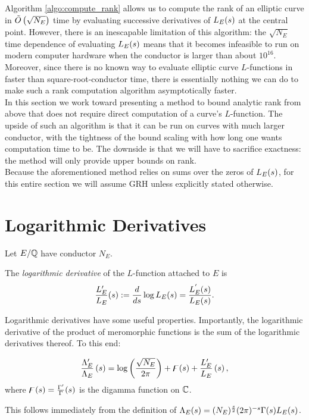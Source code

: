 
Algorithm \ref{algo:compute_rank} allows us to compute the rank of an elliptic curve in $\tilde{O}\left(\sqrt{N_E}\right)$ time by evaluating successive derivatives of $L_E(s)$ at the central point. However, there is an inescapable limitation of this algorithm: the $\sqrt{N_E}$ time dependence of evaluating $L_E(s)$ means that it becomes infeasible to run on modern computer hardware when the conductor is larger than about $10^{16}$. Moreover, since there is no known way to evaluate elliptic curve $L$-functions in faster than square-root-conductor time, there is essentially nothing we can do to make such a rank computation algorithm asymptotically faster. \\

In this section we work toward presenting a method to bound analytic rank from above that does not require direct computation of a curve's $L$-function. The upside of such an algorithm is that it can be run on curves with much larger conductor, with the tightness of the bound scaling with how long one wants computation time to be. The downside is that we will have to sacrifice exactness: the method will only provide upper bounds on rank. \\

Because the aforementioned method relies on sums over the zeros of $L_E(s)$, for this entire section we will assume GRH unless explicitly stated otherwise.

\newpage
\section{Logarithmic Derivatives}\label{sec:log_derivs}

Let $E/\mathbb{Q}$  have conductor $N_E$.
\begin{definition}
The {\it logarithmic derivative} of the $L$-function attached to $E$ is
\begin{equation}
\frac{L_E^{\prime}}{L_E}(s) := \frac{d}{ds} \log L_E(s) = \frac{L_E^{^{\prime}}(s)}{L_E(s)}.
\end{equation}
\end{definition}
Logarithmic derivatives have some useful properties. Importantly, the logarithmic derivative of the product of meromorphic functions is the sum of the logarithmic derivatives thereof. To this end:
\begin{proposition}
\begin{equation}\label{eqn:logderiv_relation}
\frac{\Lambda_E^{\prime}}{\Lambda_E}\left(s\right) = \log\left(\frac{\sqrt{N_E}}{2\pi}\right) + \digamma(s) + \frac{L_E^{\prime}}{L_E}\left(s\right),
\end{equation}
where $\digamma(s) = \frac{\Gamma^{\prime}}{\Gamma}(s)$ is the digamma function on $\mathbb{C}$.
\end{proposition}
This follows immediately from the definition of $\Lambda_E(s) = (N_E)^{\frac{s}{2}}(2\pi)^{-s}\Gamma(s)L_E(s)$. \\

